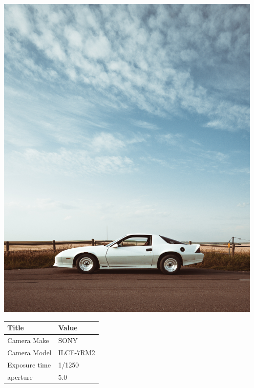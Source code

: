 \documentclass[twocolumn]{article}
\begin{document}
\begin{center}
\includegraphics[width=0.7\columnwidth]{Image8}
\newline
\newline
\newline
\newline
\newline

\begin{tabular}{| m{3cm} | m{3cm} |}
\hline

Title  &  Value   \\

\hline
Camera Make  & SONY   \\
\hline
Camera Model  & ILCE-7RM2   \\
\hline
Exposure time  & 1/1250  \\
\hline
aperture & 5.0 \\
\hline

\end{tabular}


\end{center}

\newpage
\end{document}
